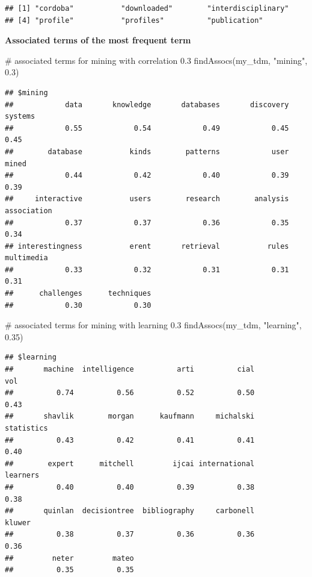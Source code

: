 \documentclass[
]{article}
\newenvironment{Shaded}{}{}
\newcommand{\CommentTok}[1]{\textcolor[rgb]{0.30,0.53,0.42}{#1}}
\newcommand{\FloatTok}[1]{\textcolor[rgb]{0.00,0.00,0.80}{#1}}
\newcommand{\FunctionTok}[1]{#1}
\newcommand{\NormalTok}[1]{#1}
\newcommand{\StringTok}[1]{\textcolor[rgb]{0.01,0.42,0.03}{#1}}
\begin{document}
\begin{verbatim}
## [1] "cordoba"           "downloaded"        "interdisciplinary"
## [4] "profile"           "profiles"          "publication"
\end{verbatim}

\textbf{Associated terms of the most frequent term}

\begin{Shaded}
\begin{Highlighting}[]
\CommentTok{\# associated terms for mining with correlation 0.3}
\FunctionTok{findAssocs}\NormalTok{(my\_tdm, }\StringTok{"mining"}\NormalTok{, }\FloatTok{0.3}\NormalTok{)}
\end{Highlighting}
\end{Shaded}

\begin{verbatim}
## $mining
##            data       knowledge       databases       discovery         systems 
##            0.55            0.54            0.49            0.45            0.45 
##        database           kinds        patterns            user           mined 
##            0.44            0.42            0.40            0.39            0.39 
##     interactive           users        research        analysis     association 
##            0.37            0.37            0.36            0.35            0.34 
## interestingness           erent       retrieval           rules      multimedia 
##            0.33            0.32            0.31            0.31            0.31 
##      challenges      techniques 
##            0.30            0.30
\end{verbatim}

\begin{Shaded}
\begin{Highlighting}[]
\CommentTok{\# associated terms for mining with learning 0.3}
\FunctionTok{findAssocs}\NormalTok{(my\_tdm, }\StringTok{"learning"}\NormalTok{, }\FloatTok{0.35}\NormalTok{)}
\end{Highlighting}
\end{Shaded}

\begin{verbatim}
## $learning
##       machine  intelligence          arti          cial           vol 
##          0.74          0.56          0.52          0.50          0.43 
##       shavlik        morgan      kaufmann     michalski    statistics 
##          0.43          0.42          0.41          0.41          0.40 
##        expert      mitchell         ijcai international      learners 
##          0.40          0.40          0.39          0.38          0.38 
##       quinlan  decisiontree  bibliography     carbonell        kluwer 
##          0.38          0.37          0.36          0.36          0.36 
##         neter         mateo 
##          0.35          0.35
\end{verbatim}
\end{document}
